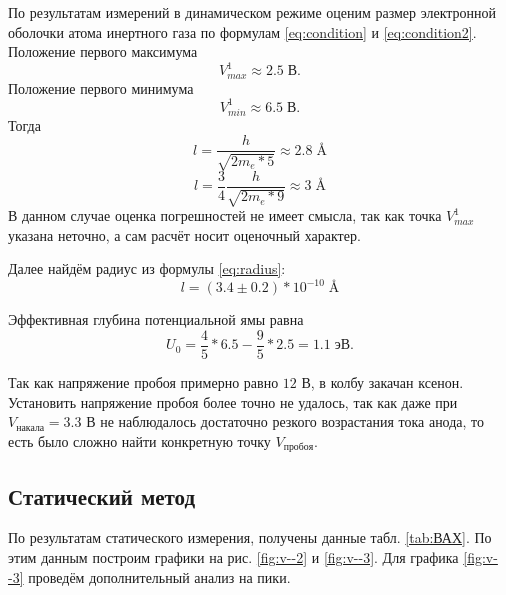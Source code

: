 \documentclass[a4paper]{article}
\begin{document}
По результатам измерений в динамическом режиме оценим размер электронной оболочки атома инертного газа по формулам \eqref{eq:condition} и \eqref{eq:condition2}. 
Положение первого максимума $$ V_{max}^1 \approx 2.5 \;В.$$
Положение первого минимума $$ V_{min}^1 \approx 6.5 \; В.$$
Тогда 
\begin{equation*}\label{key}
	l = \frac{h}{\sqrt{2 m_e * 5}} \approx 2.8\; \text{\AA{}}
\end{equation*}
\begin{equation*}
	l = \frac{3}{4} \frac{h}{\sqrt{2 m_e * 9}} \approx 3\; \text{\AA{}}
\end{equation*}
В данном случае оценка погрешностей не имеет смысла, так как точка $ V_{max}^1 $ указана неточно, а сам расчёт носит оценочный характер.

Далее найдём радиус из формулы \eqref{eq:radius}:
\begin{equation*}\label{key}
	l = (3.4 \pm 0.2)*10^{-10} \; \text{\AA{}}
\end{equation*}

Эффективная глубина потенциальной ямы равна
\begin{equation*}\label{key}
	U_0 = \frac{4}{5}*6.5 - \frac{9}{5}*2.5 = 1.1 \;эВ.
\end{equation*}

Так как напряжение пробоя примерно равно $ 12  $ В, в колбу закачан ксенон. Установить напряжение пробоя более точно не удалось, так как даже при $ V_{накала} = 3.3 $ В не наблюдалось достаточно резкого возрастания тока анода, то есть было сложно найти конкретную точку $ V_{пробоя}. $

\subsection{Статический метод}

По результатам статического измерения, получены данные табл. \ref{tab:ВАХ}. По этим данным построим графики на рис. \ref{fig:v--2} и \ref{fig:v--3}. Для графика \ref{fig:v--3} проведём дополнительный анализ на пики.
\end{document}
